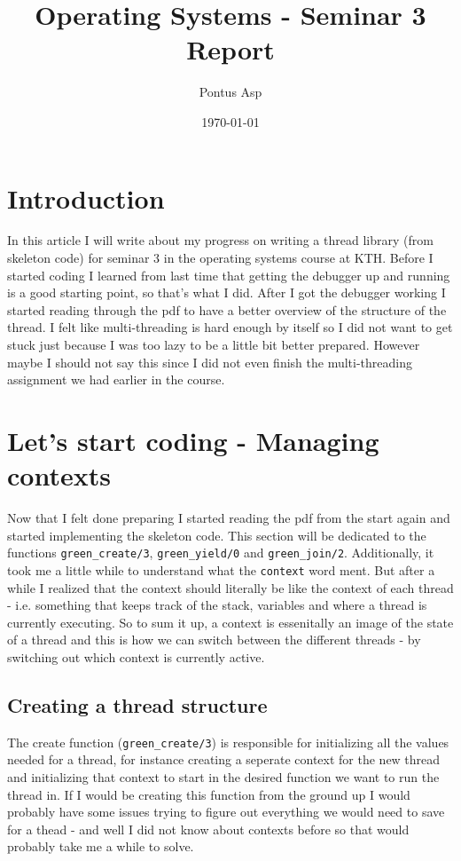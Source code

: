 \documentclass[a4paper, 12pt]{article}
\def\code#1{\texttt{#1}}
\begin{document}
\title{\vspace{4.0cm}Operating Systems - Seminar 3 Report}
\author{Pontus Asp}
\date{\today}
\maketitle
\thispagestyle{empty}
\newpage

\tableofcontents
\newpage

\clearpage
{}

\section{Introduction}
In this article I will write about my progress on writing a thread library (from skeleton code) for seminar 3 in the operating systems course at KTH. Before I started coding I learned from last time that getting the debugger up and running is a good starting point, so that's what I did. After I got the debugger working I started reading through the pdf to have a better overview of the structure of the thread. I felt like multi-threading is hard enough by itself so I did not want to get stuck just because I was too lazy to be a little bit better prepared. However maybe I should not say this since I did not even finish the multi-threading assignment we had earlier in the course.

\section{Let's start coding - Managing contexts}
Now that I felt done preparing I started reading the pdf from the start again and started implementing the skeleton code. This section will be dedicated to the functions \code{green\_create/3}, \code{green\_yield/0} and \code{green\_join/2}.
\newline Additionally, it took me a little while to understand what the \code{context} word ment. But after a while I realized that the context should literally be like the context of each thread - i.e. something that keeps track of the stack, variables and where a thread is currently executing. So to sum it up, a context is essenitally an image of the state of a thread and this is how we can switch between the different threads - by switching out which context is currently active.

\subsection{Creating a thread structure}
The create function (\code{green\_create/3}) is responsible for initializing all the values needed for a thread, for instance creating a seperate context for the new thread and initializing that context to start in the desired function we want to run the thread in.
If I would be creating this function from the ground up I would probably have some issues trying to figure out everything we would need to save for a thead - and well I did not know about contexts before so that would probably take me a while to solve.
\end{document}

